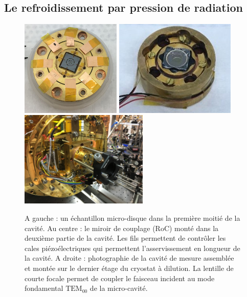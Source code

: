 \documentclass[12pt,a4paper]{article}
\newcommand{\uroc}{\micro RoC}
\begin{document}
\subsection{Le refroidissement par pression de radiation}

\begin{figure}
\center
\includegraphics[height=130pt]{figures/cavity_microwheel.jpg}
\includegraphics[height=130pt]{figures/cavity_uroc.jpg}
\includegraphics[height=130pt]{figures/IMG_1766.JPG}
\caption{A gauche : un échantillon micro-disque dans la première moitié de la cavité.
Au centre : le miroir de couplage (\uroc) monté dans la deuxième partie de la cavité.
Les fils permettent de contrôler les cales piézoélectriques qui permettent l'asservissement en longueur de la cavité.
A droite : photographie de la cavité de mesure assemblée et montée sur le dernier étage du cryostat à dilution.
La lentille de courte focale permet de coupler le faisceau incident au mode fondamental $\mathrm{TEM_{00}}$ de la micro-cavité.}
\end{figure}
\end{document}
